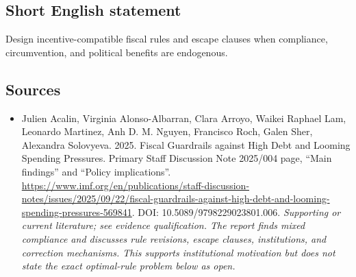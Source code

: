 \documentclass[11pt]{article}
\begin{document}
\subsection{Short English statement}
Design incentive-compatible fiscal rules and escape clauses when compliance, circumvention, and political benefits are endogenous.

\subsection{Sources}
\begin{itemize}\raggedright
\item[\textnormal{[S1]}]\hypertarget{source:30007540:1}{} Julien Acalin, Virginia Alonso-Albarran, Clara Arroyo, Waikei Raphael Lam, Leonardo Martinez, Anh D. M. Nguyen, Francisco Roch, Galen Sher, Alexandra Solovyeva. 2025. Fiscal Guardrails against High Debt and Looming Spending Pressures. Primary Staff Discussion Note 2025/004 page, “Main findings” and “Policy implications”.
\url{https://www.imf.org/en/publications/staff-discussion-notes/issues/2025/09/22/fiscal-guardrails-against-high-debt-and-looming-spending-pressures-569841}.
DOI: 10.5089/9798229023801.006.
{\small\textit{Supporting or current literature; see evidence qualification. The report finds mixed compliance and discusses rule revisions, escape clauses, institutions, and correction mechanisms. This supports institutional motivation but does not state the exact optimal-rule problem below as open.}}
\end{itemize}
\end{document}
